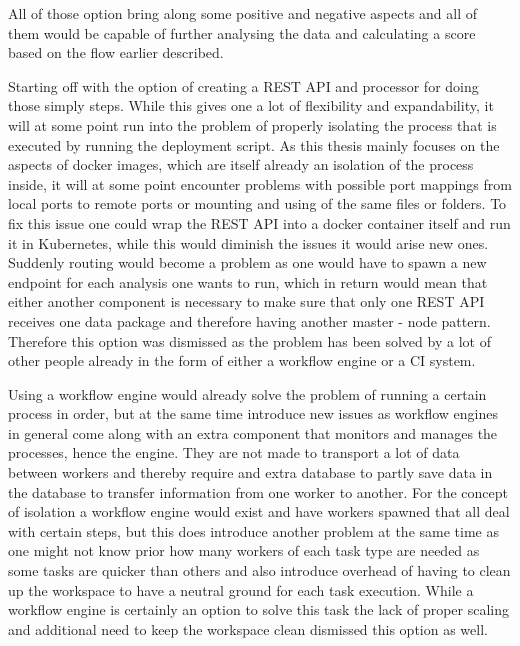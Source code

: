 All of those option bring along some positive and negative aspects and all of them would be capable of further analysing the data and calculating a score based on the flow earlier described.

Starting off with the option of creating a REST API and processor for doing those simply steps. While this gives one a lot of flexibility and expandability, it will at some point run into the problem of properly isolating the process that is executed by running the deployment script. As this thesis mainly focuses on the aspects of docker images, which are itself already an isolation of the process inside, it will at some point encounter problems with possible port mappings from local ports to remote ports or mounting and using of the same files or folders. To fix this issue one could wrap the REST API into a docker container itself and run it in Kubernetes, while this would diminish the issues it would arise new ones. Suddenly routing would become a problem as one would have to spawn a new endpoint for each analysis one wants to run, which in return would mean that either another component is necessary to make sure that only one REST API receives one data package and therefore having another master - node pattern.
Therefore this option was dismissed as the problem has been solved by a lot of other people already in the form of either a workflow engine or a CI system.

Using a workflow engine would already solve the problem of running a certain process in order, but at the same time introduce new issues as workflow engines in general come along with an extra component that monitors and manages the processes, hence the engine. They are not made to transport a lot of data between workers and thereby require and extra database to partly save data in the database to transfer information from one worker to another. For the concept of isolation a workflow engine would exist and have workers spawned that all deal with certain steps, but this does introduce another problem at the same time as one might not know prior how many workers of each task type are needed as some tasks are quicker than others and also introduce overhead of having to clean up the workspace to have a neutral ground for each task execution. While a workflow engine is certainly an option to solve this task the lack of proper scaling and additional need to keep the workspace clean dismissed this option as well.

